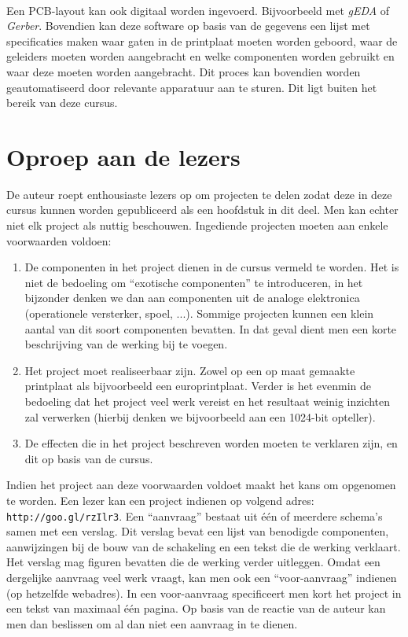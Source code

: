 \paragraph{}
Een PCB-layout kan ook digitaal worden ingevoerd. Bijvoorbeeld met \emph{gEDA} of \emph{Gerber}. Bovendien kan deze software op basis van de gegevens een lijst met specificaties maken waar gaten in de printplaat moeten worden geboord, waar de geleiders moeten worden aangebracht en welke componenten worden gebruikt en waar deze moeten worden aangebracht. Dit proces kan bovendien worden geautomatiseerd door relevante apparatuur aan te sturen. Dit ligt buiten het bereik van deze cursus.
\section{Oproep aan de lezers}
De auteur roept enthousiaste lezers op om projecten te delen zodat deze in deze cursus kunnen worden gepubliceerd als een hoofdstuk in dit deel. Men kan echter niet elk project als nuttig beschouwen. Ingediende projecten moeten aan enkele voorwaarden voldoen:
\begin{enumerate}
 \item De componenten in het project dienen in de cursus vermeld te worden. Het is niet de bedoeling om ``exotische componenten'' te introduceren, in het bijzonder denken we dan aan componenten uit de analoge elektronica (operationele versterker, spoel, ...). Sommige projecten kunnen een klein aantal van dit soort componenten bevatten. In dat geval dient men een korte beschrijving van de werking bij te voegen.
 \item Het project moet realiseerbaar zijn. Zowel op een op maat gemaakte printplaat als bijvoorbeeld een europrintplaat. Verder is het evenmin de bedoeling dat het project veel werk vereist en het resultaat weinig inzichten zal verwerken (hierbij denken we bijvoorbeeld aan een 1024-bit opteller).
 \item De effecten die in het project beschreven worden moeten te verklaren zijn, en dit op basis van de cursus.
\end{enumerate}
Indien het project aan deze voorwaarden voldoet maakt het kans om opgenomen te worden. Een lezer kan een project indienen op volgend adres: \texttt{http://goo.gl/rzIlr3}. Een ``aanvraag'' bestaat uit \'e\'en of meerdere schema's samen met een verslag. Dit verslag bevat een lijst van benodigde componenten, aanwijzingen bij de bouw van de schakeling en een tekst die de werking verklaart. Het verslag mag figuren bevatten die de werking verder uitleggen. Omdat een dergelijke aanvraag veel werk vraagt, kan men ook een ``voor-aanvraag'' indienen (op hetzelfde webadres). In een voor-aanvraag specificeert men kort het project in een tekst van maximaal \'e\'en pagina. Op basis van de reactie van de auteur kan men dan beslissen om al dan niet een aanvraag in te dienen.